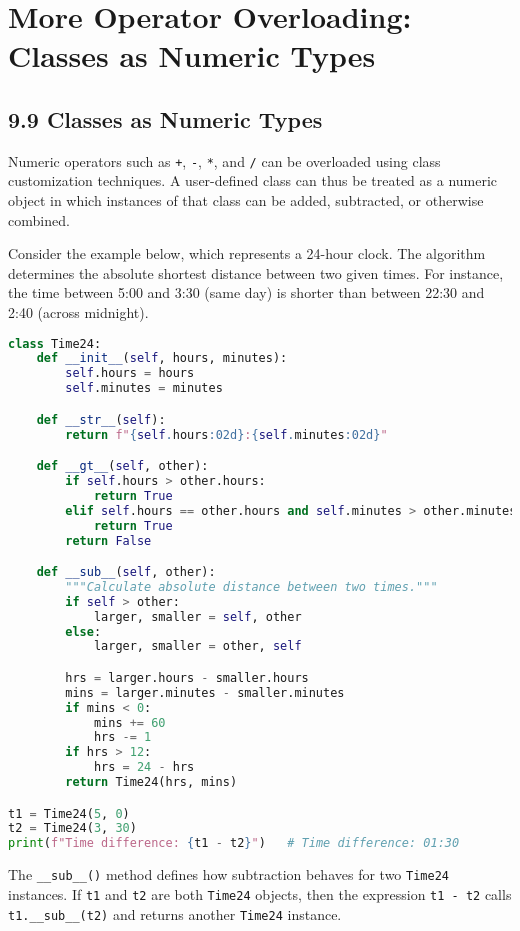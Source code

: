\chapter{More Operator Overloading: Classes as Numeric Types}

\section*{9.9 Classes as Numeric Types}

Numeric operators such as \texttt{+}, \texttt{-}, \texttt{*}, and \texttt{/} can be overloaded using class customization techniques.  
A user-defined class can thus be treated as a numeric object in which instances of that class can be added, subtracted, or otherwise combined.  

Consider the example below, which represents a 24-hour clock.  
The algorithm determines the absolute shortest distance between two given times.  
For instance, the time between 5:00 and 3:30 (same day) is shorter than between 22:30 and 2:40 (across midnight).

\begin{lstlisting}[language=Python, caption={Extending the Time class with an overloaded subtraction operator}]
class Time24:
    def __init__(self, hours, minutes):
        self.hours = hours
        self.minutes = minutes

    def __str__(self):
        return f"{self.hours:02d}:{self.minutes:02d}"

    def __gt__(self, other):
        if self.hours > other.hours:
            return True
        elif self.hours == other.hours and self.minutes > other.minutes:
            return True
        return False

    def __sub__(self, other):
        """Calculate absolute distance between two times."""
        if self > other:
            larger, smaller = self, other
        else:
            larger, smaller = other, self

        hrs = larger.hours - smaller.hours
        mins = larger.minutes - smaller.minutes
        if mins < 0:
            mins += 60
            hrs -= 1
        if hrs > 12:
            hrs = 24 - hrs
        return Time24(hrs, mins)

t1 = Time24(5, 0)
t2 = Time24(3, 30)
print(f"Time difference: {t1 - t2}")   # Time difference: 01:30
\end{lstlisting}

\noindent
The \texttt{\_\_sub\_\_()} method defines how subtraction behaves for two \texttt{Time24} instances.  
If \texttt{t1} and \texttt{t2} are both \texttt{Time24} objects, then the expression \texttt{t1 - t2}  
calls \texttt{t1.\_\_sub\_\_(t2)} and returns another \texttt{Time24} instance.

